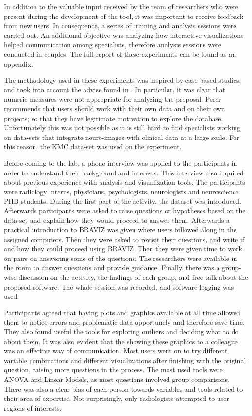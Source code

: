 In addition to the valuable input received by the team of researchers who were present during the development of the tool, it was important to receive feedback from new users. In consequence, a series of training and analysis sessions were carried out. An additional objective was analyzing how interactive visualizations helped communication among specialists, therefore analysis sessions were conducted in couples. The full report of these experiments can be found as an appendix. 

The methodology used in these experiments was inspired by case based studies, and took into account the advise found in \autocite{lam_seven_2011}. In particular, it was clear that numeric measures were not appropriate for analyzing the proposal. Perer \autocite{perer_integrating_2008} recommends that users should work with their own data and on their own projects; so that they have legitimate motivation to explore the database. Unfortunately this was not possible as it is still hard to find specialists working on data-sets that integrate neuro-images with clinical data at a large scale. For this reason, the KMC data-set was used on the experiment. 

Before coming to the lab, a phone interview was applied to the participants in order to understand their background and interests. This interview also inquired about previous experience with analysis and visualization tools. The participants were radiology interns, physicians, psychologists, neurologists and neuroscience PHD students. During the first part of the activity, the dataset was introduced. Afterwards participants were asked to raise questions or hypotheses based on the data-set and explain how they would proceed to answer them. Afterwards a practical introduction to BRAVIZ was given where users followed along in the assigned computers. Then they were asked to revisit their questions, and write if and how they could proceed using BRAVIZ. Then  they were given time to work on pairs on answering some of the questions. The researchers were available in the room to answer questions and provide guidance. Finally, there was a group-wise discussion on the activity, the findings of each group, and free talk about the proposed software. The whole session was recorded, and software logging was used. 

Participants agreed that having plots and graphics available at all time allowed them to notice errors and problematic data opportunely and therefore save time. They also found useful the tools for exploring outliers and deciding what to do about them. It was also evident that the showing these graphics to a colleague was an effective way of communication. Most users went on to try different variable combinations and different visualizations after finishing with the original question, raising more questions in the process. The most used tools were ANOVA and Linear Models, as most questions involved group comparisons. There was also a clear bias of each person towards variables and tools related to their area of expertise.  Not surprisingly, only radiologists attempted to user regions of interests.  

